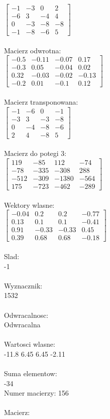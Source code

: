 \documentclass[a4paper,12pt]{article}
\begin{document}
$\begin{bmatrix} -1&-3&0&2\\-6&3&-4&4\\0&-3&-8&-8\\-1&-8&-6&5 \end{bmatrix}$
\\
\\
Macierz odwrotna:\\

$\begin{bmatrix} -0.5&-0.11&-0.07&0.17\\-0.3&0.05&-0.04&0.02\\0.32&-0.03&-0.02&-0.13\\-0.2&0.01&-0.1&0.12 \end{bmatrix}$
\\
\\
Macierz transponowana:\\

$\begin{bmatrix} -1&-6&0&-1\\-3&3&-3&-8\\0&-4&-8&-6\\2&4&-8&5 \end{bmatrix}$
\\
\\
Macierz do potegi 3:\\

$\begin{bmatrix} 119&-85&112&-74\\-78&-335&-308&288\\-512&-309&-1380&-564\\175&-723&-462&-289 \end{bmatrix}$
\\
\\
Wektory wlasne:\\

$\begin{bmatrix} -0.04&0.2&0.2&-0.77\\0.13&0.1&0.1&-0.41\\0.91&-0.33&-0.33&0.45\\0.39&0.68&0.68&-0.18 \end{bmatrix}$
\\
\\
Slad:\\
-1
\\
\\
Wyznacznik:\\
1532
\\
\\
Odwracalnosc:\\
Odwracalna
\\
\\
Wartosci wlasne:\\
-11.8 6.45 6.45 -2.11
\\
\\
Suma elementow:\\
-34
\\
\newpage
Numer macierzy:
156
\\
\\
Macierz:\\
\end{document}
